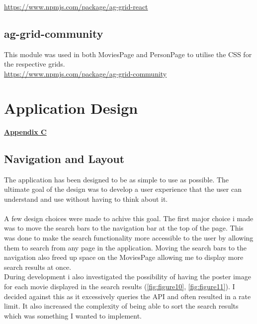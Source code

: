 \documentclass[12pt,a4paper]{article}
\begin{document}
			\href{https://www.npmjs.com/package/ag-grid-react}{https://www.npmjs.com/package/ag-grid-react}
		
		\subsection{ag-grid-community}
			This module was used in both MoviesPage and PersonPage to utilise the CSS for the respective grids.\\

			\href{https://www.npmjs.com/package/ag-grid-community}{https://www.npmjs.com/package/ag-grid-community}
	
	\newpage

	\section{Application Design}
		\hyperref[subsec:appendixC]{\textbf{Appendix C}}
		\subsection{Navigation and Layout}
			The application has been designed to be as simple to use as possible. The ultimate goal of the 
			design was to develop a user experience that the user can understand and use without having to 
			think about it.\\
			\\
			A few design choices were made to achive this goal. The first major choice i made was to move the 
			search bars to the navigation bar at the top of the page. This was done to make the search 
			functionality more accessible to the user by allowing them to search from any page in the 
			application. Moving the search bars to the navigation also freed up space on the MoviesPage 
			allowing me to display more search results at once.\\

			During development i also investigated the possibility of having the poster image for each movie 
			displayed in the search results (\cref{fig:figure10}, \cref{fig:figure11}). I decided against this 
			as it excessively queries the API and often resulted in a rate limit. It also increased the complexity 
			of being able to sort the search results which was something I wanted to implement.\\
\end{document}
